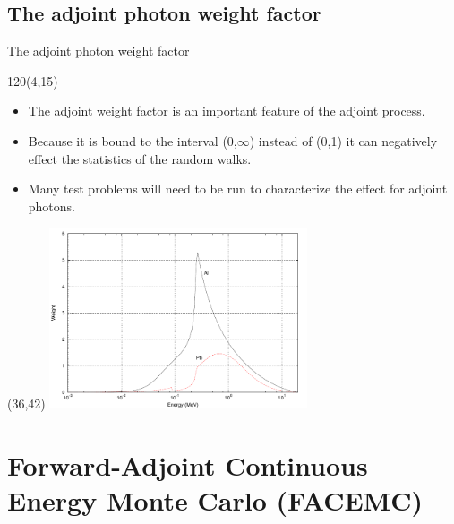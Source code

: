 \documentclass{beamer}
\begin{document}
\subsection{The adjoint photon weight factor}
\begin{frame}{The adjoint photon weight factor}

  \begin{textblock}{120}(4,15)
    \begin{itemize}
      \item The adjoint weight factor is an important feature of the adjoint 
        process.
      \item Because it is bound to the interval (0,$\infty$) instead of (0,1) it
        can negatively effect the statistics of the random walks.
      \item Many test problems will need to be run to characterize the effect
        for adjoint photons.
    \end{itemize}
  \end{textblock}

  \begin{textblock}{20}(36,42)
    \includegraphics[width=3.0in]{../document/chapters/photon_interactions/adjoint_weight_factor.pdf}
  \end{textblock}
  
\end{frame}

\section{Forward-Adjoint Continuous Energy Monte Carlo (FACEMC)}
\end{document}

